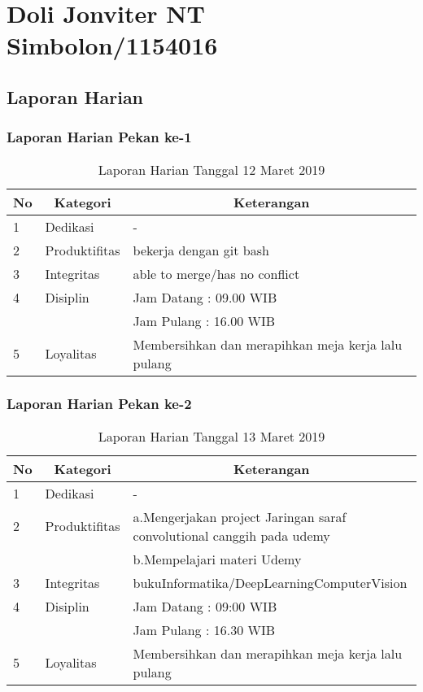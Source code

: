\chapter{Doli Jonviter NT Simbolon/1154016}

\section{Laporan Harian}

\subsection{Laporan Harian Pekan ke-1}

\begin{table}[htp]
\caption{Laporan Harian Tanggal 12 Maret 2019}
\label{tab:lh120319}
\begin{tabular}{|l|l|l|}
\hline
\textbf{No} & \multicolumn{1}{c|}{\textbf{Kategori}} & \multicolumn{1}{c|}{\textbf{Keterangan}} \\ \hline
1 & Dedikasi & - \\ \hline
2 & Produktifitas & bekerja dengan git bash \\
3 & Integritas & able to merge/has no conflict \\ \hline
4 & Disiplin & Jam Datang : 09.00 WIB \\
 &  & Jam Pulang : 16.00 WIB \\ \hline
5 & Loyalitas & Membersihkan dan merapihkan meja kerja lalu pulang  \\ \hline
\end{tabular}
\end{table}

\subsection{Laporan Harian Pekan ke-2}

\begin{table}[htp]
\caption{Laporan Harian Tanggal 13 Maret 2019}
\label{tab:lh130319}
\begin{tabular}{|l|l|l|}
\hline
\textbf{No} & \multicolumn{1}{c|}{\textbf{Kategori}} & \multicolumn{1}{c|}{\textbf{Keterangan}} \\ \hline
1 & Dedikasi & - \\ \hline
2 & Produktifitas & a.Mengerjakan project Jaringan saraf convolutional canggih pada udemy \\
  & & b.Mempelajari materi Udemy \\ \hline
3 & Integritas & bukuInformatika/DeepLearningComputerVision \\ \hline
4 & Disiplin & Jam Datang : 09:00 WIB \\
 &  & Jam Pulang : 16.30 WIB \\ \hline
5 & Loyalitas & Membersihkan dan merapihkan meja kerja lalu pulang \\ \hline
\end{tabular}
\end{table}


